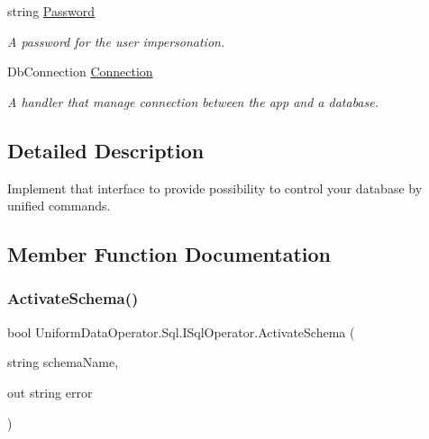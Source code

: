 \begin{DoxyCompactItemize}
string \mbox{\hyperlink{interface_uniform_data_operator_1_1_sql_1_1_i_sql_operator_a90f63ab37347ec080b37dc3256ead7a4}{Password}}
\begin{DoxyCompactList}\small\item\em A password for the user impersonation. \end{DoxyCompactList}\item 
Db\+Connection \mbox{\hyperlink{interface_uniform_data_operator_1_1_sql_1_1_i_sql_operator_a99f034a986828e96955e3187cdfb28da}{Connection}}
\begin{DoxyCompactList}\small\item\em A handler that manage connection between the app and a database. \end{DoxyCompactList}\end{DoxyCompactItemize}


\subsection{Detailed Description}
Implement that interface to provide possibility to control your database by unified commands. 



\subsection{Member Function Documentation}
\mbox{\label{interface_uniform_data_operator_1_1_sql_1_1_i_sql_operator_a5ae8328a464ef80f1ae1bd46a573c265}} 
\subsubsection{\texorpdfstring{Activate\+Schema()}{ActivateSchema()}}
{\footnotesize\ttfamily bool Uniform\+Data\+Operator.\+Sql.\+I\+Sql\+Operator.\+Activate\+Schema (\begin{DoxyParamCaption}\item[{string}]{schema\+Name,  }\item[{out string}]{error }\end{DoxyParamCaption})}



